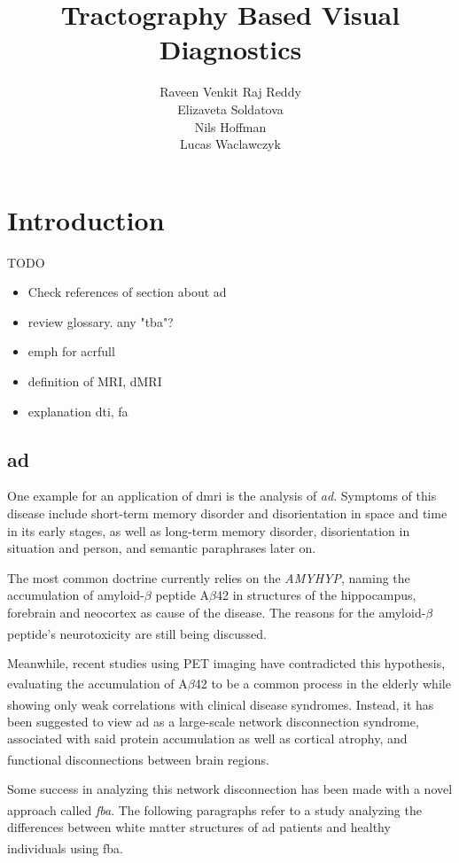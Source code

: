 \documentclass[plainreport]{cgvpub}
\author{Raveen Venkit Raj Reddy\\Elizaveta Soldatova\\Nils Hoffman\\Lucas Waclawczyk}
\title{Tractography Based Visual Diagnostics}
\newcommand{\newcite}[1]{\textsuperscript{\cite{#1}}}
\begin{document}
	\glsaddall
	\chapter{Introduction}
	TODO
	\begin{itemize}
		\item Check references of section about ad
		\item review glossary. any "tba"?
		\item emph for acrfull
		\item definition of MRI, dMRI
		\item explanation dti, fa
	\end{itemize}

	\section{\acrfull{ad}}
	One example for an application of \acrshort{dmri} is the analysis of \emph{\acrfull{ad}}. Symptoms of this disease include short-term memory disorder and disorientation in space and time in its early stages, as well as long-term memory disorder, disorientation in situation and person, and semantic paraphrases later on. 
	
	The most common doctrine currently relies on the \emph{\gls{AMYHYP}}, naming the accumulation of amyloid-$ \beta $ peptide A$ \beta $42 in structures of the hippocampus, forebrain and neocortex as cause of the disease. The reasons for the amyloid-$ \beta $ peptide's neurotoxicity are still being discussed\newcite{ad_haass}. 
	
	Meanwhile, recent studies using PET imaging have contradicted this hypothesis, evaluating the accumulation of A$ \beta $42 to be a common process in the elderly\newcite{mintun06}\newcite{aizenstein08} while showing only weak correlations with clinical disease syndromes\newcite{rabinovici08}\newcite{rowe10}\newcite{leyton11}\newcite{rodrigue12}. Instead, it has been suggested to view \acrshort{ad} as a large-scale network disconnection syndrome, associated with said protein accumulation as well as cortical atrophy, and functional disconnections between brain regions\newcite{canter16}. 
	
	Some success in analyzing this network disconnection has been made with a novel approach called \emph{\acrfull{fba}}\newcite{raffelt17}. The following paragraphs refer to a study analyzing the differences between white matter structures of \acrshort{ad} patients and healthy individuals\newcite{ad} using \acrshort{fba}. 
	
\end{document}
